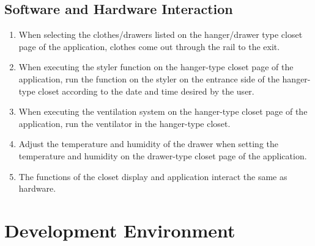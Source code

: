 \documentclass[conference]{IEEEtran}
\begin{document}
\subsection{Software and Hardware Interaction}
\begin{enumerate}
    \item When selecting the clothes/drawers listed on the hanger/drawer type closet page of the application, clothes come out through the rail to the exit.
    \item When executing the styler function on the hanger-type closet page of the application, run the function on the styler on the entrance side of the hanger-type closet according to the date and time desired by the user.
    \item When executing the ventilation system on the hanger-type closet page of the application, run the ventilator in the hanger-type closet.
    \item Adjust the temperature and humidity of the drawer when setting the temperature and humidity on the drawer-type closet page of the application.
    \item The functions of the closet display and application interact the same as hardware.
\end{enumerate}


\section{Development Environment}
\end{document}
